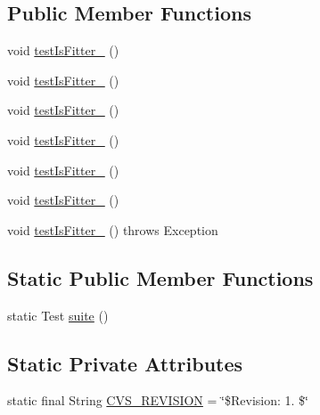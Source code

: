 \subsection*{Public Member Functions}
\begin{DoxyCompactItemize}
\item 
void \hyperlink{classorg_1_1jgap_1_1_delta_fitness_evaluator_test_aa718e6051e39f7ce56b66f55df0c6d5c}{test\-Is\-Fitter\-\_} ()
\item 
void \hyperlink{classorg_1_1jgap_1_1_delta_fitness_evaluator_test_a364645c672441279dd860897b5fb735e}{test\-Is\-Fitter\-\_} ()
\item 
void \hyperlink{classorg_1_1jgap_1_1_delta_fitness_evaluator_test_abd090d0169b56221aeafa8608ab94efe}{test\-Is\-Fitter\-\_} ()
\item 
void \hyperlink{classorg_1_1jgap_1_1_delta_fitness_evaluator_test_a06e736719cea3d868e152b4e408aa3e7}{test\-Is\-Fitter\-\_} ()
\item 
void \hyperlink{classorg_1_1jgap_1_1_delta_fitness_evaluator_test_a6c2f9c43d122197f70b757baacc4744f}{test\-Is\-Fitter\-\_} ()
\item 
void \hyperlink{classorg_1_1jgap_1_1_delta_fitness_evaluator_test_acc78e2b95a387b8cf26c6777bd3a1c3c}{test\-Is\-Fitter\-\_} ()
\item 
void \hyperlink{classorg_1_1jgap_1_1_delta_fitness_evaluator_test_a13f295a16b2d61720f54a029d005aa30}{test\-Is\-Fitter\-\_} ()  throws Exception 
\end{DoxyCompactItemize}
\subsection*{Static Public Member Functions}
\begin{DoxyCompactItemize}
\item 
static Test \hyperlink{classorg_1_1jgap_1_1_delta_fitness_evaluator_test_ab55f77b4705ae61bae4de9066236a4d5}{suite} ()
\end{DoxyCompactItemize}
\subsection*{Static Private Attributes}
\begin{DoxyCompactItemize}
\item 
static final String \hyperlink{classorg_1_1jgap_1_1_delta_fitness_evaluator_test_a1df82420a8f568df8c56444beef965b1}{C\-V\-S\-\_\-\-R\-E\-V\-I\-S\-I\-O\-N} = \char`\"{}\$Revision\-: 1. \$\char`\"{}
\end{DoxyCompactItemize}
